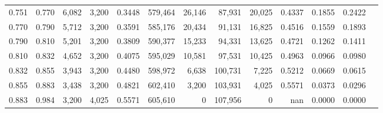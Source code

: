 \begin{tabular}{rrrrrrrrrrrrr}
0.751 & 0.770 &  6,082 & 3,200 &                                     0.3448 & 579,464 &  26,146 &  87,931 &  20,025 & 0.4337 & 0.1855 & 0.2422 \\
0.770 & 0.790 &  5,712 & 3,200 &                                     0.3591 & 585,176 &  20,434 &  91,131 &  16,825 & 0.4516 & 0.1559 & 0.1893 \\
0.790 & 0.810 &  5,201 & 3,200 &                                     0.3809 & 590,377 &  15,233 &  94,331 &  13,625 & 0.4721 & 0.1262 & 0.1411 \\
0.810 & 0.832 &  4,652 & 3,200 &                                     0.4075 & 595,029 &  10,581 &  97,531 &  10,425 & 0.4963 & 0.0966 & 0.0980 \\
0.832 & 0.855 &  3,943 & 3,200 &                                     0.4480 & 598,972 &   6,638 & 100,731 &   7,225 & 0.5212 & 0.0669 & 0.0615 \\
0.855 & 0.883 &  3,438 & 3,200 &                                     0.4821 & 602,410 &   3,200 & 103,931 &   4,025 & 0.5571 & 0.0373 & 0.0296 \\
0.883 & 0.984 &  3,200 & 4,025 &                                     0.5571 & 605,610 &       0 & 107,956 &       0 &    nan & 0.0000 & 0.0000 \\
\bottomrule
\end{tabular}
